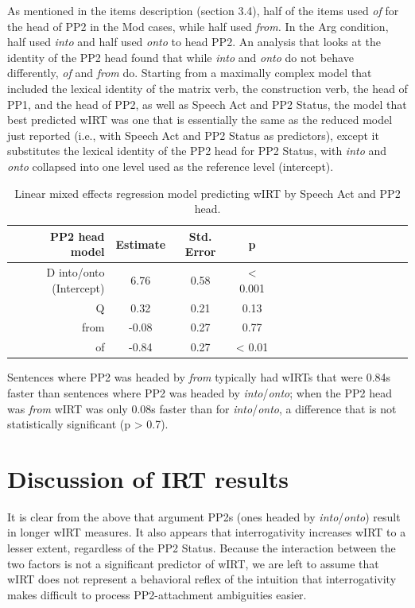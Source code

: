\documentclass[12pt,oneside]{book}
\begin{document}
As mentioned in the items description (section 3.4), half of the items used \emph{of} for the head of PP2 in the Mod cases, while half used \emph{from.} In the Arg condition, half used \emph{into} and half used \emph{onto} to head PP2. An analysis that looks at the identity of the PP2 head found that while \emph{into} and \emph{onto} do not behave differently, \emph{of} and \emph{from} do. Starting from a maximally complex model that included the lexical identity of the matrix verb, the construction verb, the head of PP1, and the head of PP2, as well as Speech Act and PP2 Status, the model that best predicted wIRT was one that is essentially the same as the reduced model just reported (i.e., with Speech Act and PP2 Status as predictors), except it substitutes the lexical identity of the PP2 head for PP2 Status, with \emph{into} and \emph{onto} collapsed into one level used as the reference level (intercept).

\begin{table}[!h]

\caption{\label{tab:pp2hd}Linear mixed effects regression model predicting wIRT by Speech Act and PP2 head.}
\centering
\begin{tabular}{rcccrcccrcccrccc}
\toprule
PP2 head model & Estimate & Std. Error & p\\
\midrule
D into/onto (Intercept) & 6.76 & 0.58 & < 0.001\\
Q & 0.32 & 0.21 & 0.13\\
from & -0.08 & 0.27 & 0.77\\
of & -0.84 & 0.27 & < 0.01\\
\bottomrule
\end{tabular}
\end{table}

Sentences where PP2 was headed by \emph{from} typically had wIRTs that were 0.84s faster than sentences where PP2 was headed by \emph{into}/\emph{onto}; when the PP2 head was \emph{from} wIRT was only 0.08s faster than for \emph{into}/\emph{onto}, a difference that is not statistically significant (p \textgreater{} 0.7).

\hypertarget{discussion-of-irt-results}{%
\section{Discussion of IRT results}\label{discussion-of-irt-results}}

It is clear from the above that argument PP2s (ones headed by \emph{into}/\emph{onto}) result in longer wIRT measures. It also appears that interrogativity increases wIRT to a lesser extent, regardless of the PP2 Status. Because the interaction between the two factors is not a significant predictor of wIRT, we are left to assume that wIRT does not represent a behavioral reflex of the intuition that interrogativity makes difficult to process PP2-attachment ambiguities easier.
\end{document}
